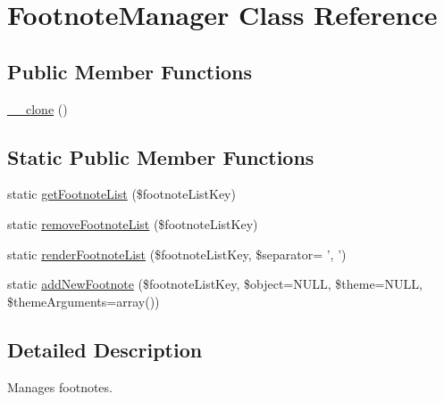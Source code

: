 \hypertarget{class_footnote_manager}{\section{Footnote\-Manager Class Reference}
\label{class_footnote_manager}
}
\subsection*{Public Member Functions}
\begin{DoxyCompactItemize}
\item 
\hyperlink{class_footnote_manager_afc31a41101a63b4826ec67a5e378edef}{\-\_\-\-\_\-clone} ()
\end{DoxyCompactItemize}
\subsection*{Static Public Member Functions}
\begin{DoxyCompactItemize}
\item 
static \hyperlink{class_footnote_manager_a8135454391d1bad6e9e74b3b22f2f68f}{get\-Footnote\-List} (\$footnote\-List\-Key)
\item 
static \hyperlink{class_footnote_manager_a257c10216e61863ec649804540bc61bc}{remove\-Footnote\-List} (\$footnote\-List\-Key)
\item 
static \hyperlink{class_footnote_manager_accbb468c7c39bc796700e426d2ef6117}{render\-Footnote\-List} (\$footnote\-List\-Key, \$separator= ', ')
\item 
static \hyperlink{class_footnote_manager_a9c0282e7a31f22e71a09e739753c8240}{add\-New\-Footnote} (\$footnote\-List\-Key, \$object=N\-U\-L\-L, \$theme=N\-U\-L\-L, \$theme\-Arguments=array())
\end{DoxyCompactItemize}


\subsection{Detailed Description}
Manages footnotes. 

